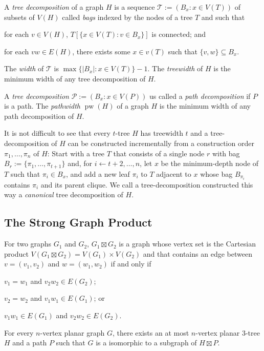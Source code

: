 \documentclass[kpfonts]{patmorin}
\DeclareMathOperator{\pw}{pw}
\begin{document}
A \emph{tree decomposition} of a graph $H$ is a sequence $\mathcal{T}:=(B_x:x\in V(T))$ of subsets of $V(H)$ called \emph{bags} indexed by the nodes of a tree $T$ and such that
 \begin{inparaenum}[(i)]
     \item for each $v\in V(H)$, $T[\{x\in V(T):v\in B_x\}]$ is connected; and
     \item for each $vw\in E(H)$, there exists some $x\in v(T)$ such that $\{v,w\}\subseteq B_x$.
\end{inparaenum}
The \emph{width} of $\mathcal{T}$ is $\max\{|B_x|:x\in V(T)\}-1$. The \emph{treewidth} of $H$ is the minimum width of any tree decomposition of $H$.

A \emph{tree decomposition }$\mathcal{P}:=(B_x:x\in V(P))$ us called a \emph{path decomposition} if $P$ is a path. The \emph{pathwidth} $\pw(H)$ of a graph $H$ is the minimum width of any path decomposition of $H$.

It is not difficult to see that every $t$-tree $H$ has treewidth $t$ and a tree-decomposition of $H$ can be constructed incrementally from a construction order $\pi_1,\ldots,\pi_n$ of $H$: Start with a tree $T$ that consists of a single node $r$ with bag $B_r:=\{\pi_1,\ldots,\pi_{t+1}\}$ and, for $i\gets t+2,\ldots,n$, let $x$ be the minimum-depth node of $T$ such that $\pi_i\in B_x$, and add a new leaf $\pi_i$ to $T$ adjacent to $x$ whose bag $B_{\pi_i}$ contains $\pi_i$ and its parent clique.  We call a tree-decomposition constructed this way a \emph{canonical} tree decomposition of $H$.

\subsection{The Strong Graph Product}

For two graphs $G_1$ and $G_2$, $G_1\boxtimes G_2$ is a graph whose vertex set is the Cartesian product $V(G_1\boxtimes G_2)= V(G_1)\times V(G_2)$ and that contains an edge between $v=(v_1,v_2)$ and $w=(w_1,w_2)$ if and only if
\begin{inparaenum}[(i)]
    \item $v_1=w_1$ and $v_2w_2\in E(G_2)$;
    \item $v_2=w_2$ and $v_1w_1\in E(G_1)$; or
    \item $v_1w_1\in E(G_1)$ and $v_2w_2\in E(G_2)$.
\end{inparaenum}

\begin{thm}\cite{dujmovic.joret.ea:planar}\label{product}
    For every $n$-vertex planar graph $G$, there exists an at most $n$-vertex planar 3-tree $H$ and a path $P$ such that $G$ is a isomorphic to a subgraph of $H\boxtimes P$.
\end{thm}
\end{document}
